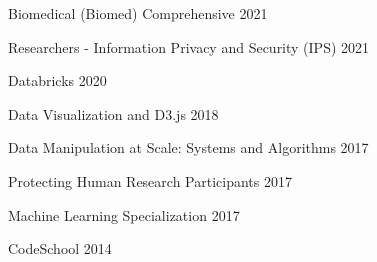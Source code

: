 \documentclass{my_cv}
\begin{document}
\item[]
    Biomedical (Biomed) Comprehensive 2021 
    \vspace{-6pt}
    \begin{itemize}
    \end{itemize} 
\item[]
    Researchers - Information Privacy and Security (IPS) 2021 
    \vspace{-6pt}
    \begin{itemize}
    \end{itemize} 
\item[]
    Databricks 2020 
    \vspace{-6pt}
    \begin{itemize}
    \end{itemize} 
\item[]
    Data Visualization and D3.js 2018 
    \vspace{-6pt}
    \begin{itemize}
    \end{itemize} 
\item[]
    Data Manipulation at Scale: Systems and Algorithms 2017 
    \vspace{-6pt}
    \begin{itemize}
    \end{itemize} 
\item[]
    Protecting Human Research Participants 2017 
    \vspace{-6pt}
    \begin{itemize}
    \end{itemize} 
\item[]
    Machine Learning Specialization 2017 
    \vspace{-6pt}
    \begin{itemize}
    \end{itemize} 
\item[]
    CodeSchool 2014 
    \vspace{-6pt}
    \begin{itemize}
    \end{itemize} 
\end{document}
